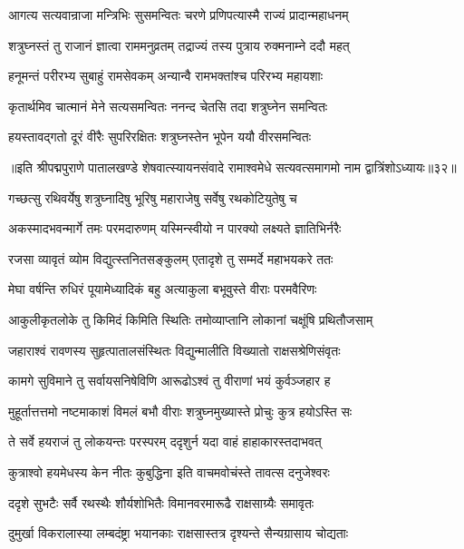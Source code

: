 \twolineshloka
{आगत्य सत्यवान्राजा मन्त्रिभिः सुसमन्वितः}
{चरणे प्रणिपत्यास्मै राज्यं प्रादान्महाधनम्}%

\twolineshloka
{शत्रुघ्नस्तं तु राजानं ज्ञात्वा राममनुव्रतम्}
{तद्राज्यं तस्य पुत्राय रुक्मनाम्ने ददौ महत्}%

\twolineshloka
{हनूमन्तं परीरभ्य सुबाहुं रामसेवकम्}
{अन्यान्वै रामभक्तांश्च परिरभ्य महायशाः}%

\twolineshloka
{कृतार्थमिव चात्मानं मेने सत्यसमन्वितः}
{ननन्द चेतसि तदा शत्रुघ्नेन समन्वितः}%

\twolineshloka
{हयस्तावद्गतो दूरं वीरैः सुपरिरक्षितः}
{शत्रुघ्नस्तेन भूपेन ययौ वीरसमन्वितः}%

{॥इति श्रीपद्मपुराणे पातालखण्डे शेषवात्स्यायनसंवादे रामाश्वमेधे सत्यवत्समागमो नाम द्वात्रिंशोऽध्यायः॥३२॥}



\twolineshloka
{गच्छत्सु रथिवर्येषु शत्रुघ्नादिषु भूरिषु}
{महाराजेषु सर्वेषु रथकोटियुतेषु च}%

\twolineshloka
{अकस्मादभवन्मार्गे तमः परमदारुणम्}
{यस्मिन्स्वीयो न पारक्यो लक्ष्यते ज्ञातिभिर्नरैः}%

\twolineshloka
{रजसा व्यावृतं व्योम विद्युत्स्तनितसङ्कुलम्}
{एतादृशे तु सम्मर्दे महाभयकरे ततः}%

\twolineshloka
{मेघा वर्षन्ति रुधिरं पूयामेध्यादिकं बहु}
{अत्याकुला बभूवुस्ते वीराः परमवैरिणः}%

\twolineshloka
{आकुलीकृतलोके तु किमिदं किमिति स्थितिः}
{तमोव्याप्तानि लोकानां चक्षूंषि प्रथितौजसाम्}%

\twolineshloka
{जहाराश्वं रावणस्य सुहृत्पातालसंस्थितः}
{विद्युन्मालीति विख्यातो राक्षसश्रेणिसंवृतः}%

\twolineshloka
{कामगे सुविमाने तु सर्वायसनिषेविणि}
{आरूढोऽश्वं तु वीराणां भयं कुर्वञ्जहार ह}%

\twolineshloka
{मुहूर्तात्तत्तमो नष्टमाकाशं विमलं बभौ}
{वीराः शत्रुघ्नमुख्यास्ते प्रोचुः कुत्र हयोऽस्ति सः}%

\twolineshloka
{ते सर्वे हयराजं तु लोकयन्तः परस्परम्}
{ददृशुर्न यदा वाहं हाहाकारस्तदाभवत्}%

\twolineshloka
{कुत्राश्वो हयमेधस्य केन नीतः कुबुद्धिना}
{इति वाचमवोचंस्ते तावत्स दनुजेश्वरः}%

\twolineshloka
{ददृशे सुभटैः सर्वै रथस्थैः शौर्यशोभितैः}
{विमानवरमारूढै राक्षसाग्र्यैः समावृतः}%

\twolineshloka
{दुमुर्खा विकरालास्या लम्बदंष्ट्रा भयानकाः}
{राक्षसास्तत्र दृश्यन्ते सैन्यग्रासाय चोद्यताः}%

